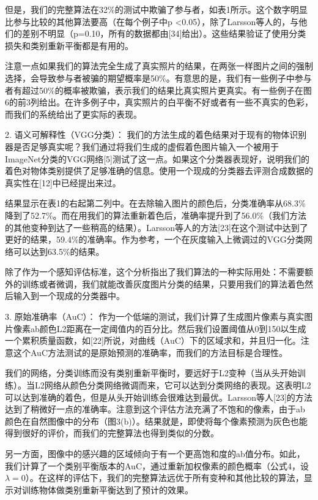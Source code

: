 但是，我们的完整算法在32\%的测试中欺骗了参与者，如表1所示。这个数字明显比参与比较的其他算法要高（在每个例子中p <0.05），除了Larsson等人的，与他们的差别不明显（p=0.10，所有的数据都由[34]给出）。这些结果验证了使用分类损失和类别重新平衡都是有用的。

注意一点如果我们的算法完全生成了真实照片的结果，在两张一样图片之间的强制选择，会导致参与者被骗的期望概率是50\%。有意思的是，我们有一些例子中参与者有超过50\%的概率被欺骗，表示我们的结果比真实照片更真实。有一些例子在图6的前3列给出。在许多例子中，真实照片的白平衡不好或者有一些不真实的色彩，而我们的系统给出了更实际的表现。

2. {\heiti 语义可解释性（VGG分类）： } 我们的方法生成的着色结果对于现有的物体识别器是否足够真实呢？我们通过将我们生成的虚假着色图片输入一个被用于ImageNet分类的VGG网络[5]测试了这一点。如果这个分类器表现好，说明我们的着色对物体类别提供了足够准确的信息。使用一个现成的分类器去评测合成数据的真实性在[12]中已经提出来过。

结果显示在表1的右起第二列中。在去除输入图片的颜色后，分类准确率从68.3\%降到了52.7\%。而在用我们的算法重新着色后，准确率提升到了56.0\%（我们方法的其他变种到达了一些稍高的结果）。Larsson等人的方法[23]在这个测试中达到了更好的结果，59.4\%的准确率。作为参考，一个在灰度输入上微调过的VGG分类网络可以达到63.5\%的结果。

除了作为一个感知评估标准，这个分析指出了我们算法的一种实际用处：不需要额外的训练或者微调，我们就能改善灰度图片分类的结果，只要用我们的算法着色然后输入到一个现成的分类器中。

3. {\heiti 原始准确率（AuC）： } 作为一个低端的测试，我们计算了生成图片像素与真实图片像素ab颜色L2距离在一定阈值内的百分比。然后我们设置阈值从0到150以生成一个累积质量函数，如[22]所说，对曲线（AuC）下的区域求和，并且归一化。注意这个AuC方法测试的是原始预测的准确率，而我们的方法目标是合理性。

我们的网络，分类训练而没有类别重新平衡时，要远好于L2变种（当从头开始训练）。当L2网络从颜色分类网络微调而来，它可以达到分类网络的表现。这表明L2可以达到准确的着色，但是从头开始训练会很难达到最优。Larsson等人[23]的方法达到了稍微好一点的准确率。注意到这个评估方法充满了不饱和的像素，由于ab颜色在自然图像中的分布（图3(b)）。结果就是，即使将每个像素预测为灰色也能得到很好的评价，而我们的完整算法也得到类似的分数。

另一方面，图像中的感兴趣的区域倾向于有一个更高饱和度的ab值分布。如此，我们计算了一个类别平衡版本的AuC，通过重新加权像素的颜色概率（公式4，设$\lambda = 0$）。在这样的评估下，我们的完整算法远优于所有变种和其他比较的算法，显示对训练物体做类别重新平衡达到了预计的效果。

